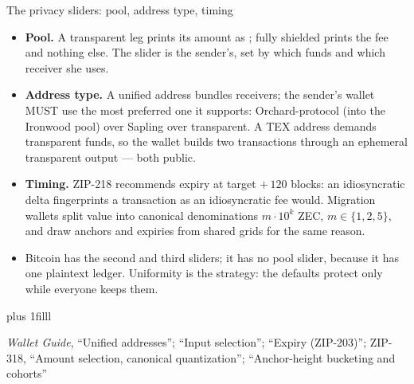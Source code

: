 \documentclass[aspectratio=169,11pt]{beamer}
\newcommand{\src}[1]{\par\vskip0pt plus 1filll
  {\fontsize{6}{7.2}\selectfont\color{arbdim}\raggedright #1\par}}
\begin{document}
\begin{frame}{The privacy sliders: pool, address type, timing}
\small
\begin{itemize}
  \item \textbf{Pool.} A transparent leg prints its amount as \Hvb;
    fully shielded prints the fee and nothing else. The slider is the
    sender's, set by which funds and which receiver she uses.
  \item \textbf{Address type.} A unified address bundles receivers; the
    sender's wallet MUST use the most preferred one it supports:
    Orchard-protocol (into the Ironwood pool) over Sapling over
    transparent. A TEX address demands transparent funds, so the wallet
    builds two transactions through an ephemeral transparent output ---
    both public.
  \item \textbf{Timing.} ZIP-218 recommends expiry at target $+\,120$
    blocks: an idiosyncratic delta fingerprints a
    transaction as an idiosyncratic fee would. Migration wallets split
    value into canonical denominations $m \cdot 10^{k}$ ZEC,
    $m \in \{1, 2, 5\}$, and draw anchors and expiries from shared grids
    for the same reason.
  \item Bitcoin has the second and third sliders; it has no pool slider,
    because it has one plaintext ledger. Uniformity is the strategy:
    the defaults protect only while everyone keeps them.
\end{itemize}
\src{\emph{Wallet Guide}, ``Unified addresses''; ``Input selection''; ``Expiry
  (ZIP-203)''; ZIP-318, ``Amount selection, canonical quantization'';
  ``Anchor-height bucketing and cohorts''}
\end{frame}
\end{document}
